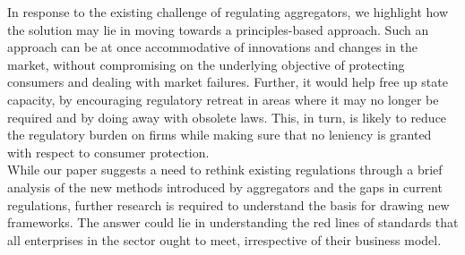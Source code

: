 \documentclass[a4paper, 12pt]{article}
\begin{document}
In response to the existing challenge of regulating aggregators, we highlight how the solution may lie in moving towards a principles-based approach. Such an approach can be at once accommodative of innovations and changes in the market, without compromising on the underlying objective of protecting consumers and dealing with market failures. Further, it would help free up state capacity, by encouraging regulatory retreat in areas where it may no longer be required and by doing away with obsolete laws. This, in turn, is likely to reduce the regulatory burden on firms while making sure that no leniency is granted with respect to consumer protection. \\

While our paper suggests a need to rethink existing regulations through a brief analysis of the new methods introduced by aggregators and the gaps in current regulations, further research is required to understand the basis for drawing new frameworks. The answer could lie in understanding the red lines of standards that all enterprises in the sector ought to meet, irrespective of their business model.\\

               
         

	\printbibliography[title={Bibliography}]
\newpage
\end{document}
